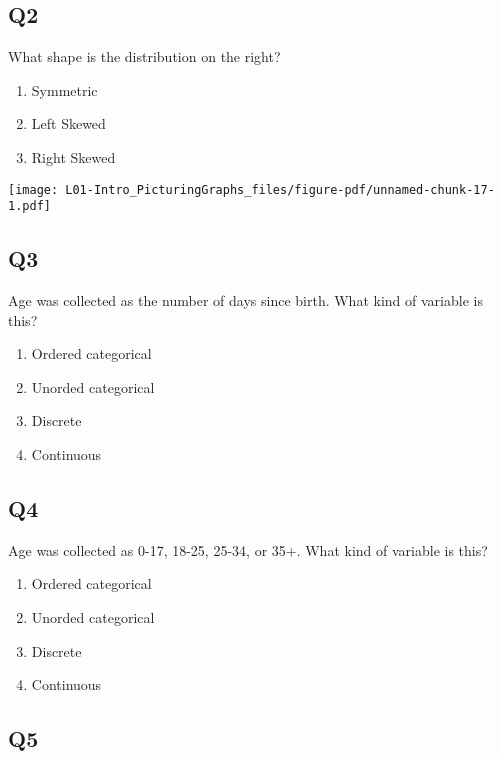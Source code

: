 \documentclass[
  letterpaper,
  DIV=11,
  numbers=noendperiod]{scrreprt}
\providecommand{\tightlist}{%
  \setlength{\itemsep}{0pt}\setlength{\parskip}{0pt}}\usepackage{longtable,booktabs,array}
\begin{document}
\hypertarget{q2}{%
\subsection{Q2}\label{q2}}

\vspace{0.5cm}

What shape is the distribution on the right?

\begin{enumerate}
\def\labelenumi{\arabic{enumi}.}
\tightlist
\item
  Symmetric
\item
  Left Skewed
\item
  Right Skewed
\end{enumerate}

\texttt{[image: L01-Intro\_PicturingGraphs\_files/figure-pdf/unnamed-chunk-17-1.pdf]}

\hypertarget{q3}{%
\subsection{Q3}\label{q3}}

Age was collected as the number of days since birth. What kind of
variable is this?

\begin{enumerate}
\def\labelenumi{\arabic{enumi}.}
\tightlist
\item
  Ordered categorical
\item
  Unorded categorical
\item
  Discrete
\item
  Continuous
\end{enumerate}

\hypertarget{q4}{%
\subsection{Q4}\label{q4}}

Age was collected as 0-17, 18-25, 25-34, or 35+. What kind of variable
is this?

\begin{enumerate}
\def\labelenumi{\arabic{enumi}.}
\tightlist
\item
  Ordered categorical
\item
  Unorded categorical
\item
  Discrete
\item
  Continuous
\end{enumerate}

\hypertarget{q5}{%
\subsection{Q5}\label{q5}}
\end{document}
